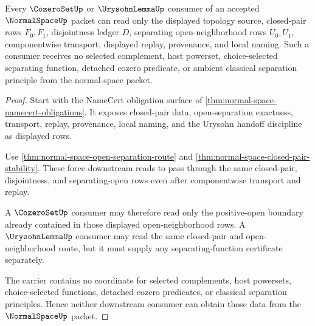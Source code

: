 \begin{theorem}
\label{thm:normal-space-cozero-urysohn-handoff}
Every $\CozeroSetUp$ or $\UrysohnLemmaUp$ consumer of an accepted $\NormalSpaceUp$ packet can read only the displayed topology source, closed-pair rows $F_0,F_1$, disjointness ledger $D$, separating open-neighborhood rows $U_0,U_1$, componentwise transport, displayed replay, provenance, and local naming. Such a consumer receives no selected complement, host powerset, choice-selected separating function, detached cozero predicate, or ambient classical separation principle from the normal-space packet.
\end{theorem}
\begin{proof}
Start with the NameCert obligation surface of \autoref{thm:normal-space-namecert-obligations}. It exposes closed-pair data, open-separation exactness, transport, replay, provenance, local naming, and the Urysohn handoff discipline as displayed rows.

Use \autoref{thm:normal-space-open-separation-route} and \autoref{thm:normal-space-closed-pair-stability}. These force downstream reads to pass through the same closed-pair, disjointness, and separating-open rows even after componentwise transport and replay.

A $\CozeroSetUp$ consumer may therefore read only the positive-open boundary already contained in those displayed open-neighborhood rows. A $\UrysohnLemmaUp$ consumer may read the same closed-pair and open-neighborhood route, but it must supply any separating-function certificate separately.

The carrier contains no coordinate for selected complements, host powersets, choice-selected functions, detached cozero predicates, or classical separation principles. Hence neither downstream consumer can obtain those data from the $\NormalSpaceUp$ packet.
\end{proof}

